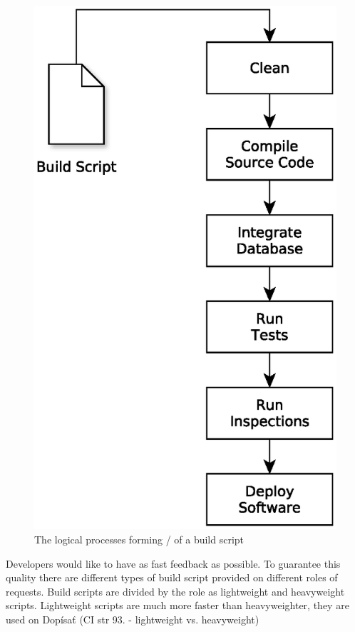 \begin{figure}[H]
	\centering
	\includegraphics[scale=0.5]{yEd/the_logical_processes_of_a_build_script.eps}
	\caption{The logical processes {\color{red}forming / of a} build script\cite{CIPD}}
	\label{fig:lpobs}
\end{figure}

Developers would like to have as fast feedback as possible. To guarantee this quality there are different types of build script provided on different roles of requests. Build scripts are divided by the role as lightweight and heavyweight scripts. Lightweight scripts are much more faster than heavyweighter, they are used on {\color{red}Dopísať (CI str 93. - lightweight vs. heavyweight)}


